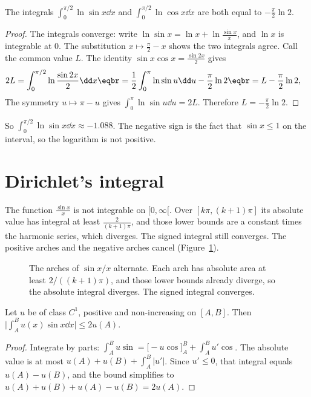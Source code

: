 \begin{proposition}\label{prop:logsin}
The integrals $\int_0^{\pi/2}\ln\sin x\dd x$ and $\int_0^{\pi/2}\ln\cos x\dd x$ are both equal to $-\frac\pi2\ln2$.
\end{proposition}
\begin{proof}
The integrals converge: write $\ln\sin x=\ln x+\ln\frac{\sin x}x$, and $\ln x$ is integrable at $0$. The substitution $x\mapsto\frac\pi2-x$ shows the two integrals agree. Call the common value $L$. The identity $\sin x\cos x=\frac{\sin2x}2$ gives
\[
\begin{aligned}2L&=\int_0^{\pi/2}\ln\frac{\sin2x}2\dd x\eqbr=\frac12\int_0^\pi\ln\sin u\dd u-\frac\pi2\ln2\eqbr=L-\frac\pi2\ln2,\end{aligned}
\]
The symmetry $u\mapsto\pi-u$ gives $\int_0^\pi\ln\sin u\dd u=2L$. Therefore $L=-\frac\pi2\ln2$.
\end{proof}

So $\int_0^{\pi/2}\ln\sin x\dd x\approx-1.088$. The negative sign is the fact that $\sin x\le1$ on the interval, so the logarithm is not positive.

\section{Dirichlet's integral}

The function $\frac{\sin x}x$ is not integrable on $[0,\infty[$. Over $[k\pi,(k+1)\pi]$ its absolute value has integral at
least $\frac2{(k+1)\pi}$, and those lower bounds are a constant times the harmonic series, which diverges. The signed integral still converges. The positive arches and the negative arches cancel (Figure~\ref{fig:rw04-dirichlet}).

\begin{figure}[ht]
\centering
{}
\caption{The arches of $\sin x/x$ alternate. Each arch has absolute area at least $2/((k+1)\pi)$, and those lower bounds already diverge, so the absolute integral diverges. The signed integral converges.}
\label{fig:rw04-dirichlet}
\end{figure}

\begin{lemma}\label{lem:secondmean}
Let $u$ be of class $C^1$, positive and non-increasing on $[A,B]$. Then $\bigl|\int_A^Bu(x)\sin x\dd x\bigr|\le2u(A)$.
\end{lemma}
\begin{proof}
Integrate by parts: $\int_A^Bu\sin=\bigl[-u\cos\bigr]_A^B+\int_A^Bu'\cos$. The absolute value is at most $u(A)+u(B)+\int_A^B|u'|$. Since $u'\le0$, that integral equals $u(A)-u(B)$, and the bound simplifies to $u(A)+u(B)+u(A)-u(B)=2u(A)$.
\end{proof}

